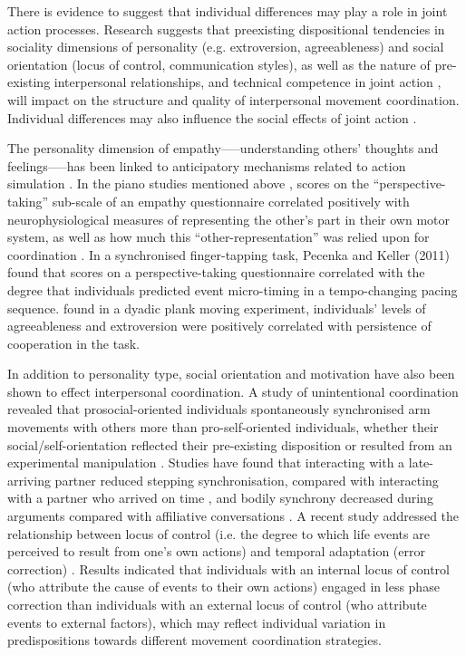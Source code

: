 \begin{CJK}{UTF8}{gbsn}
    There is evidence to suggest that individual differences may play a role in joint action processes.  Research suggests that preexisting dispositional tendencies in sociality dimensions of personality (e.g. extroversion, agreeableness) and social orientation (locus of control, communication styles), as well as the nature of pre-existing interpersonal relationships, and technical competence in joint action \citep{Novembre2014}, will impact on the structure and quality of interpersonal movement coordination.  Individual differences may also influence the social effects of joint action \citep{Marsh2009}.

    The personality dimension of empathy—--understanding others’ thoughts and feelings—--has been linked to anticipatory mechanisms related to action simulation \citep{Sevdalis2014,Keller2014}.  In the piano studies mentioned above \citep{Novembre2012}, scores on the ``perspective-taking'' sub-scale of an empathy questionnaire correlated positively with neurophysiological measures of representing the other’s part in their own motor system, as well as how much this ``other-representation'' was relied upon for coordination \citep{Novembre2014a}.  In a synchronised finger-tapping task, Pecenka and Keller (2011) found that scores on a perspective-taking questionnaire correlated with the degree that individuals predicted event micro-timing in a tempo-changing pacing sequence.  \textcite{Richardson2007} found in a dyadic plank moving experiment, individuals’ levels of agreeableness and extroversion were positively correlated with persistence of cooperation in the task.

    In addition to personality type, social orientation and motivation have also been shown to effect interpersonal coordination.  A study of unintentional coordination revealed that prosocial-oriented individuals spontaneously synchronised arm movements with others more than pro-self-oriented individuals, whether their social/self-orientation reflected their pre-existing disposition or resulted from an experimental manipulation \citep{Lumsden2012}.  Studies have found that interacting with a late-arriving partner reduced stepping synchronisation, compared with interacting with a partner who arrived on time \citep{Miles2010}, and bodily synchrony decreased during arguments compared with affiliative conversations \citep{Paxton2013}.  A recent study addressed the relationship between locus of control (i.e. the degree to which life events are perceived to result from one’s own actions) and temporal adaptation (error correction) \citep{Fairhurst2014}.   Results indicated that individuals with an internal locus of control (who attribute the cause of events to their own actions) engaged in less phase correction than individuals with an external locus of control (who attribute events to external factors), which may reflect individual variation in predispositions towards different movement coordination strategies.


\end{CJK}
